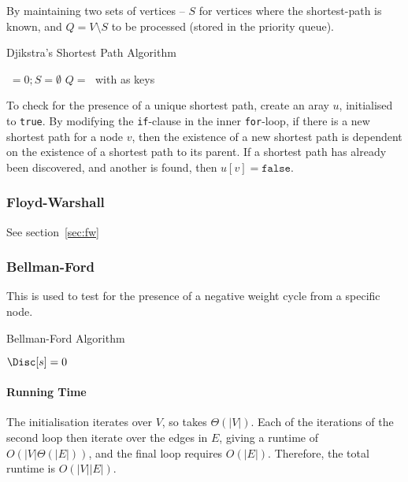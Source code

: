 \documentclass[10pt]{article}
\begin{document}
By maintaining two sets of vertices -- $S$ for vertices where the shortest-path is known, and $Q=V\setminus S$ to be processed (stored in the priority queue).
\begin{algorithm}
	\caption{Djikstra's Shortest Path Algorithm}
	
	$\;=0; S=\emptyset$\;
	$Q=\;$ with  as keys\;
\end{algorithm}
To check for the presence of a unique shortest path, create an aray $u$, initialised to \texttt{true}.  By modifying the \texttt{if}-clause in the inner \texttt{for}-loop, if there is a new shortest path for a node $v$, then the existence of a new shortest path is dependent on the existence of a shortest path to its parent.  If a shortest path has already been discovered, and another is found, then $u[v]=\texttt{false}$.
\subsubsection{Floyd-Warshall} See section~\ref{sec:fw}
\subsubsection{Bellman-Ford}This is used to test for the presence of a negative weight cycle from a specific node.
\begin{algorithm}
	\caption{Bellman-Ford Algorithm}

	$\Disc[s]=0$\;
	\;
\end{algorithm}
\paragraph{Running Time}The initialisation iterates over $V$, so takes $\Theta(|V|)$.  Each of the iterations of the second loop then iterate over the edges in $E$, giving a runtime of $O(|V|\Theta(|E|))$, and the final loop requires $O(|E|)$.  Therefore, the total runtime is $O(|V||E|)$.
\end{document}
